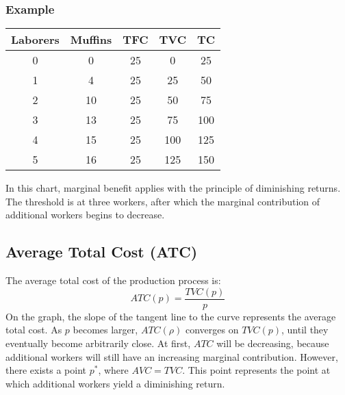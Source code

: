 \documentclass{article}
\begin{document}
\subsubsection{Example}
\begin{center}
  \begin{tabular}{|c|c|c|c|c|}
    \hline
    Laborers & Muffins & TFC & TVC  & TC  \\ \hline
    0        & 0       & 25  & 0    & 25  \\ \hline
    1        & 4       & 25  & 25   & 50  \\ \hline
    2        & 10      & 25  & 50   & 75  \\ \hline
    3        & 13      & 25  & 75   & 100 \\ \hline
    4        & 15      & 25  & 100  & 125 \\ \hline
    5        & 16      & 25  & 125  & 150 \\ \hline
  \end{tabular}
\end{center}
In this chart, marginal benefit applies with the principle of diminishing
returns. The threshold is at three workers, after which the marginal
contribution of additional workers begins to decrease.
\begin{center}
\end{center}

\subsection{Average Total Cost (ATC)}
The average total cost of the production process is:
\[ ATC(p) = \frac{TVC(p)}{p} \]
On the graph, the slope of the tangent line to the curve represents the
average total cost. As \( p \) becomes larger, \( ATC(ρ) \) converges on
\( TVC(p) \), until they eventually become arbitrarily close. At first,
\( ATC \) will be decreasing, because additional workers will still have an
increasing marginal contribution. However, there exists a point \( p^{*} \),
where \( AVC = TVC \). This point represents the point at which additional
workers yield a diminishing return.
\end{document}
